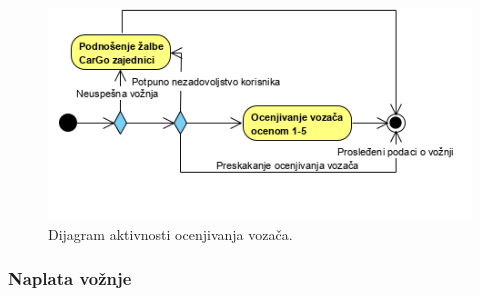 \begin{figure}[H]
\begin{center}
\includegraphics[scale=1.1]{Slike/OcenjivanjeVozaca.png}
\end{center}
    \caption{Dijagram aktivnosti ocenjivanja vozača.}
\label{fig:OcenjivanjeVozača}
\end{figure}

\subsubsection{\bfseries Naplata vožnje}

